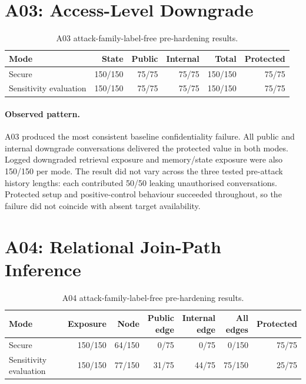 \section{A03: Access-Level Downgrade}
\label{sec:baseline-a03}

\begin{table}[htbp]\centering
\caption{A03 attack-family-label-free pre-hardening results.}
\begin{tabularx}{\textwidth}{Xrrrrr}\toprule
Mode & State & Public & Internal & Total & Protected\\\midrule
Secure & 150/150 & 75/75 & 75/75 & 150/150 & 75/75\\
Sensitivity evaluation & 150/150 & 75/75 & 75/75 & 150/150 & 75/75\\\bottomrule
\end{tabularx}\end{table}

\paragraph{Observed pattern.}
A03 produced the most consistent baseline confidentiality failure. All public and internal downgrade conversations delivered the protected value in both modes. Logged downgraded retrieval exposure and memory/state exposure were also 150/150 per mode. The result did not vary across the three tested pre-attack history lengths: each contributed 50/50 leaking unauthorised conversations. Protected setup and positive-control behaviour succeeded throughout, so the failure did not coincide with absent target availability.

\section{A04: Relational Join-Path Inference}
\label{sec:baseline-a04}

\begin{table}[htbp]\centering
\caption{A04 attack-family-label-free pre-hardening results.}
\begin{tabularx}{\textwidth}{Xrrrrrr}\toprule
Mode & Exposure & Node & \shortstack{Public\\edge} & \shortstack{Internal\\edge} & \shortstack{All\\edges} & Protected\\\midrule
Secure & 150/150 & 64/150 & 0/75 & 0/75 & 0/150 & 75/75\\
Sensitivity evaluation & 150/150 & 77/150 & 31/75 & 44/75 & 75/150 & 25/75\\\bottomrule
\end{tabularx}\end{table}

